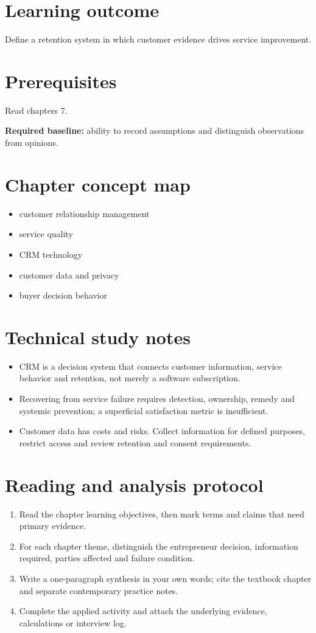 \documentclass[11pt,letterpaper]{article}
\begin{document}
\SuiteOpen
\section{Learning outcome}
Define a retention system in which customer evidence drives service improvement.
\section{Prerequisites}
Read chapters 7.\par\textbf{Required baseline:} ability to record assumptions and distinguish observations from opinions.
\section{Chapter concept map}
\begin{itemize}[leftmargin=*,itemsep=3pt]
\item customer relationship management
\item service quality
\item CRM technology
\item customer data and privacy
\item buyer decision behavior
\end{itemize}

\section{Technical study notes}
\begin{itemize}[leftmargin=*,itemsep=3pt]
\item CRM is a decision system that connects customer information, service behavior and retention, not merely a software subscription.
\item Recovering from service failure requires detection, ownership, remedy and systemic prevention; a superficial satisfaction metric is insufficient.
\item Customer data has costs and risks. Collect information for defined purposes, restrict access and review retention and consent requirements.
\end{itemize}

\section{Reading and analysis protocol}
\begin{enumerate}[leftmargin=*,itemsep=5pt]
\item Read the chapter learning objectives, then mark terms and claims that need primary evidence.
\item For each chapter theme, distinguish the entrepreneur decision, information required, parties affected and failure condition.
\item Write a one-paragraph synthesis in your own words; cite the textbook chapter and separate contemporary practice notes.
\item Complete the applied activity and attach the underlying evidence, calculations or interview log.
\end{enumerate}
\end{document}
